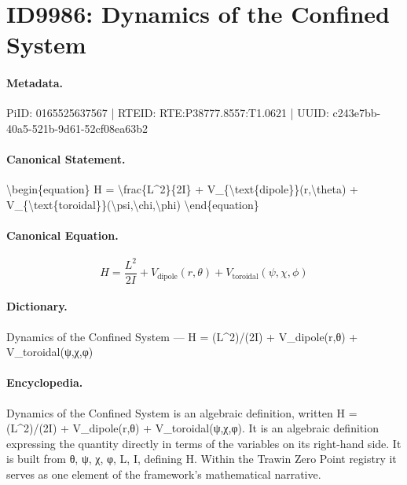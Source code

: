 \section*{ID9986: Dynamics of the Confined System}
\paragraph{Metadata.}
PiID: 0165525637567 | RTEID: RTE:P38777.8557:T1.0621 | UUID: c243e7bb-40a5-521b-9d61-52cf08ea63b2

\paragraph{Canonical Statement.}
\textbackslash{}begin\{equation\} H = \textbackslash{}frac\{L\textasciicircum{}2\}\{2I\} + V\_\{\textbackslash{}text\{dipole\}\}(r,\textbackslash{}theta) + V\_\{\textbackslash{}text\{toroidal\}\}(\textbackslash{}psi,\textbackslash{}chi,\textbackslash{}phi) \textbackslash{}end\{equation\}

\paragraph{Canonical Equation.}
\[
H = \frac{L^2}{2I} + V_{\text{dipole}}(r,\theta) + V_{\text{toroidal}}(\psi,\chi,\phi)
\]

\paragraph{Dictionary.}
Dynamics of the Confined System — H = (L\textasciicircum{}2)/(2I) + V\_dipole(r,θ) + V\_toroidal(ψ,χ,φ)

\paragraph{Encyclopedia.}
Dynamics of the Confined System is an algebraic definition, written H = (L\textasciicircum{}2)/(2I) + V\_dipole(r,θ) + V\_toroidal(ψ,χ,φ). It is an algebraic definition expressing the quantity directly in terms of the variables on its right-hand side. It is built from θ, ψ, χ, φ, L, I, defining H. Within the Trawin Zero Point registry it serves as one element of the framework's mathematical narrative.
